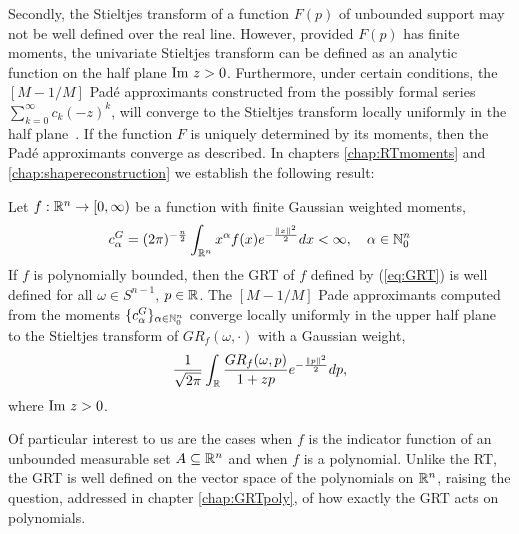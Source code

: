 Secondly, the Stieltjes transform of a function $F(p)$ of unbounded support may not be well defined over the real line. However, provided $F(p)$ has finite moments, the univariate Stieltjes transform can be defined as an analytic function on the half plane $\text{Im}~ z > 0$. Furthermore, under certain conditions, the $[M-1/M]$ Pad\'e approximants constructed from the possibly formal series $\sum_{k = 0}^\infty c_k(-z)^k$, will converge to the Stieltjes transform locally uniformly in the half plane~\cite{Bake81}. If the function $F$ is uniquely determined by its moments, then the Pad\'e approximants converge as described. In chapters \ref{chap:RTmoments} and \ref{chap:shapereconstruction} we establish the following result:
\begin{theorem}
  Let $f : \mathbb{R}^n \to [0, \infty)$ be a function with finite Gaussian weighted moments,
  \[
    c^G_\alpha = (2\pi)^{-\frac{n}{2}} \int_{\mathbb{R}^n} x^\alpha f(x) e^{-\frac{\left\| x \right\|^2}{2}} dx < \infty, \quad \alpha \in \mathbb{N}_0^n
  \]
  If $f$ is polynomially bounded, then the GRT of $f$ defined by (\ref{eq:GRT})
  is well defined for all $\omega \in S^{n-1}$, $p \in \mathbb{R}$. The $[M-1/M]$ Pade approximants computed from the moments $\{c^G_\alpha\}_{\alpha \in \mathbb{N}_0^n}$ converge locally uniformly in the upper half plane to the Stieltjes transform of $GR_f(\omega, \cdot)$ with a Gaussian weight,
  \[
    \frac1{\sqrt{2\pi}}\int_{\mathbb{R}} \frac{GR_f(\omega, p)}{1 + zp} e^{-\frac{\left\| p  \right\|^2}2}dp,
  \]
  where $\text{Im}~ z > 0$.
\end{theorem}

Of particular interest to us are the cases when $f$ is the indicator function of an unbounded measurable set $A \subseteq \mathbb{R}^n$ and when $f$ is a polynomial. 
Unlike the RT, the GRT is well defined on the vector space of the polynomials on $\mathbb{R}^n$, raising the question, addressed in chapter \ref{chap:GRTpoly}, of how exactly the GRT acts on polynomials.

